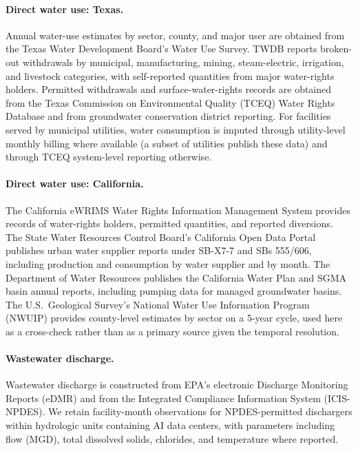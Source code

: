 \documentclass[11pt, letterpaper]{article}
\begin{document}
\paragraph{Direct water use: Texas.} Annual water-use estimates by sector, county, and major user are obtained from the Texas Water Development Board's Water Use Survey. TWDB reports broken-out withdrawals by municipal, manufacturing, mining, steam-electric, irrigation, and livestock categories, with self-reported quantities from major water-rights holders. Permitted withdrawals and surface-water-rights records are obtained from the Texas Commission on Environmental Quality (TCEQ) Water Rights Database and from groundwater conservation district reporting. For facilities served by municipal utilities, water consumption is imputed through utility-level monthly billing where available (a subset of utilities publish these data) and through TCEQ system-level reporting otherwise.

\paragraph{Direct water use: California.} The California eWRIMS Water Rights Information Management System provides records of water-rights holders, permitted quantities, and reported diversions. The State Water Resources Control Board's California Open Data Portal publishes urban water supplier reports under SB-X7-7 and SBs 555/606, including production and consumption by water supplier and by month. The Department of Water Resources publishes the California Water Plan and SGMA basin annual reports, including pumping data for managed groundwater basins. The U.S.\ Geological Survey's National Water Use Information Program (NWUIP) provides county-level estimates by sector on a 5-year cycle, used here as a cross-check rather than as a primary source given the temporal resolution.

\paragraph{Wastewater discharge.} Wastewater discharge is constructed from EPA's electronic Discharge Monitoring Reports (eDMR) and from the Integrated Compliance Information System (ICIS-NPDES). We retain facility-month observations for NPDES-permitted dischargers within hydrologic units containing AI data centers, with parameters including flow (MGD), total dissolved solids, chlorides, and temperature where reported.
\end{document}
